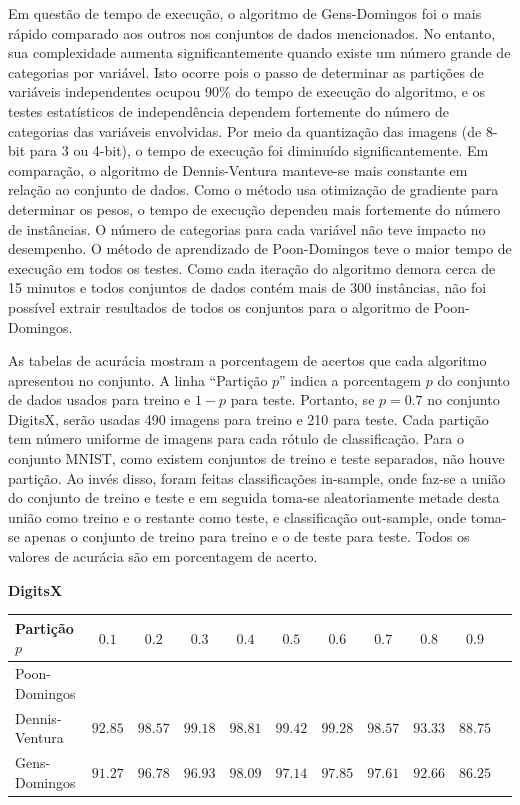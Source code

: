 \documentclass[12pt]{article}
\theoremstyle{plain}
\numberwithin{equation}{section}
\begin{document}
Em questão de tempo de execução, o algoritmo de Gens-Domingos foi o mais rápido comparado aos
outros nos conjuntos de dados mencionados. No entanto, sua complexidade aumenta significantemente
quando existe um número grande de categorias por variável. Isto ocorre pois o passo de determinar
as partições de variáveis independentes ocupou 90\% do tempo de execução do algoritmo, e os testes
estatísticos de independência dependem fortemente do número de categorias das variáveis envolvidas.
Por meio da quantização das imagens (de 8-bit para 3 ou 4-bit), o tempo de execução foi diminuído
significantemente. Em comparação, o algoritmo de Dennis-Ventura manteve-se mais constante em
relação ao conjunto de dados. Como o método usa otimização de gradiente para determinar os pesos, o
tempo de execução dependeu mais fortemente do número de instâncias. O número de categorias para
cada variável não teve impacto no desempenho. O método de aprendizado de Poon-Domingos teve o maior
tempo de execução em todos os testes. Como cada iteração do algoritmo demora cerca de 15 minutos e
todos conjuntos de dados contém mais de 300 instâncias, não foi possível extrair resultados de
todos os conjuntos para o algoritmo de Poon-Domingos.

As tabelas de acurácia mostram a porcentagem de acertos que cada algoritmo apresentou no conjunto.
A linha ``Partição $p$'' indica a porcentagem $p$ do conjunto de dados usados para treino e $1-p$
para teste. Portanto, se $p=0.7$ no conjunto DigitsX, serão usadas 490 imagens para treino e 210
para teste. Cada partição tem número uniforme de imagens para cada rótulo de classificação. Para o
conjunto MNIST, como existem conjuntos de treino e teste separados, não houve partição. Ao invés
disso, foram feitas classificações in-sample, onde faz-se a união do conjunto de treino e teste e
em seguida toma-se aleatoriamente metade desta união como treino e o restante como teste, e
classificação out-sample, onde toma-se apenas o conjunto de treino para treino e o de teste para
teste. Todos os valores de acurácia são em porcentagem de acerto.

\begin{table}[h]
  \centering\textbf{DigitsX}\vspace{0.25cm}
  \begin{tabular}{l|cccccccccc}
    Partição $p$ & $0.1$ & $0.2$ & $0.3$ & $0.4$ & $0.5$ & $0.6$ & $0.7$ & $0.8$ & $0.9$\\
    \hline
    Poon-Domingos & & & & & & & & &\\
    Dennis-Ventura & $92.85$ & $98.57$ & $99.18$ & $98.81$ & $99.42$ & $99.28$ & $98.57$ & $93.33$ & $88.75$\\
    Gens-Domingos & $91.27$ & $96.78$ & $96.93$ & $98.09$ & $97.14$ & $97.85$ & $97.61$ & $92.66$ & $86.25$\\
  \end{tabular}
\end{table}
\end{document}
